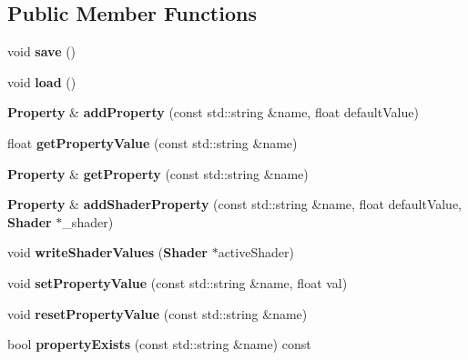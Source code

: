 \subsection*{Public Member Functions}
\begin{DoxyCompactItemize}
\item 
void {\bfseries save} ()\label{classSoundfieldViewer_1_1PropertyManager_a1de0ca0eaa4f4860517b1bef1a077a17}

\item 
void {\bfseries load} ()\label{classSoundfieldViewer_1_1PropertyManager_ab4eed743e9ecc8d476cef9a2959b8767}

\item 
{\bf Property} \& {\bfseries add\-Property} (const std\-::string \&name, float default\-Value)\label{classSoundfieldViewer_1_1PropertyManager_a52204f4c975882221e04e80d0b461d6f}

\item 
float {\bfseries get\-Property\-Value} (const std\-::string \&name)\label{classSoundfieldViewer_1_1PropertyManager_a02ea6e51004af313f8028afa0b82bd9e}

\item 
{\bf Property} \& {\bfseries get\-Property} (const std\-::string \&name)\label{classSoundfieldViewer_1_1PropertyManager_a3a5e131064b079e37699e67a1f3347a0}

\item 
{\bf Property} \& {\bfseries add\-Shader\-Property} (const std\-::string \&name, float default\-Value, {\bf Shader} $\ast$\-\_\-shader)\label{classSoundfieldViewer_1_1PropertyManager_ae905f1643b3fd035b5e0e0046b6b4613}

\item 
void {\bfseries write\-Shader\-Values} ({\bf Shader} $\ast$active\-Shader)\label{classSoundfieldViewer_1_1PropertyManager_afe6ccc9412a25847172ed21832f22c59}

\item 
void {\bfseries set\-Property\-Value} (const std\-::string \&name, float val)\label{classSoundfieldViewer_1_1PropertyManager_a318b69d7d575812c95f673b5f1abacad}

\item 
void {\bfseries reset\-Property\-Value} (const std\-::string \&name)\label{classSoundfieldViewer_1_1PropertyManager_a573b38c40dceff999f2817006ede6053}

\item 
bool {\bfseries property\-Exists} (const std\-::string \&name) const \label{classSoundfieldViewer_1_1PropertyManager_a7489ba0a7a6199d9fd104ad0945d52cf}

\end{DoxyCompactItemize}
